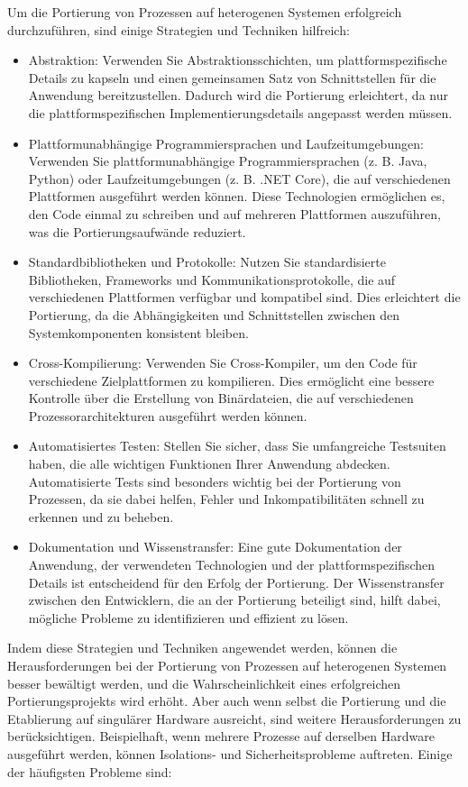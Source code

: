 \documentclass[../vs-script-first-v01.tex]{subfiles}
\begin{document}
Um die Portierung von Prozessen auf heterogenen Systemen erfolgreich durchzuführen, sind einige Strategien und Techniken hilfreich:
\begin{itemize}
\item Abstraktion: Verwenden Sie Abstraktionsschichten, um plattformspezifische Details zu kapseln und einen gemeinsamen Satz von Schnittstellen für die Anwendung bereitzustellen. Dadurch wird die Portierung erleichtert, da nur die plattformspezifischen Implementierungsdetails angepasst werden müssen.
\item Plattformunabhängige Programmiersprachen und Laufzeitumgebungen: Verwenden Sie plattformunabhängige Programmiersprachen (z. B. Java, Python) oder Laufzeitumgebungen (z. B. .NET Core), die auf verschiedenen Plattformen ausgeführt werden können. Diese Technologien ermöglichen es, den Code einmal zu schreiben und auf mehreren Plattformen auszuführen, was die Portierungsaufwände reduziert.
\item Standardbibliotheken und Protokolle: Nutzen Sie standardisierte Bibliotheken, Frameworks und Kommunikationsprotokolle, die auf verschiedenen Plattformen verfügbar und kompatibel sind. Dies erleichtert die Portierung, da die Abhängigkeiten und Schnittstellen zwischen den Systemkomponenten konsistent bleiben.
\item Cross-Kompilierung: Verwenden Sie Cross-Kompiler, um den Code für verschiedene Zielplattformen zu kompilieren. Dies ermöglicht eine bessere Kontrolle über die Erstellung von Binärdateien, die auf verschiedenen Prozessorarchitekturen ausgeführt werden können.
\item Automatisiertes Testen: Stellen Sie sicher, dass Sie umfangreiche Testsuiten haben, die alle wichtigen Funktionen Ihrer Anwendung abdecken. Automatisierte Tests sind besonders wichtig bei der Portierung von Prozessen, da sie dabei helfen, Fehler und Inkompatibilitäten schnell zu erkennen und zu beheben.
\item Dokumentation und Wissenstransfer: Eine gute Dokumentation der Anwendung, der verwendeten Technologien und der plattformspezifischen Details ist entscheidend für den Erfolg der Portierung. Der Wissenstransfer zwischen den Entwicklern, die an der Portierung beteiligt sind, hilft dabei, mögliche Probleme zu identifizieren und effizient zu lösen.
\end{itemize}
Indem diese Strategien und Techniken angewendet werden, können die Herausforderungen bei der Portierung von Prozessen auf heterogenen Systemen besser bewältigt werden, und die Wahrscheinlichkeit eines erfolgreichen Portierungsprojekts wird erhöht. Aber auch wenn selbst die Portierung und die Etablierung auf singulärer Hardware ausreicht, sind weitere Herausforderungen zu berücksichtigen. Beispielhaft, wenn mehrere Prozesse auf derselben Hardware ausgeführt werden, können Isolations- und Sicherheitsprobleme auftreten. Einige der häufigsten Probleme sind:
\end{document}
